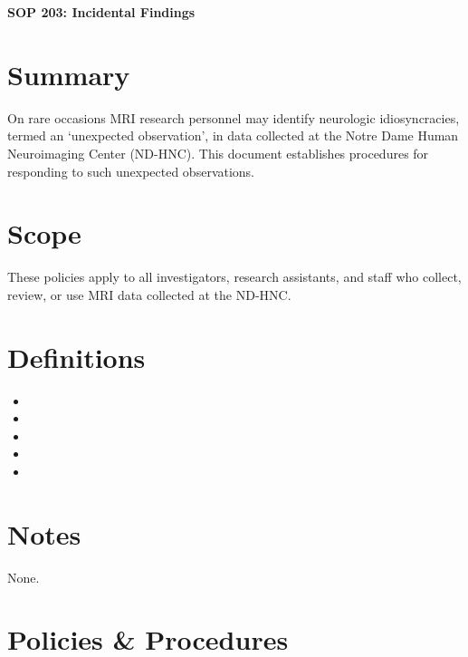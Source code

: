 \documentclass[11pt]{article}
\begin{document}
\renewcommand{\labelenumii}{\arabic{enumi}.\arabic{enumii}}
\renewcommand{\labelenumiii}{\arabic{enumi}.\arabic{enumii}.\arabic{enumiii}}
\renewcommand{\labelenumiv}{\arabic{enumi}.\arabic{enumii}.\arabic{enumiii}.\arabic{enumiv}}

\begin{center}
	\textbf{\Large SOP 203: Incidental Findings}\\
	\hrulefill
\end{center}


\section{Summary}
On rare occasions MRI research personnel may identify neurologic idiosyncracies, termed an `unexpected observation', in data collected at the Notre Dame Human Neuroimaging Center (ND-HNC). This document establishes procedures for responding to such unexpected observations.

\section{Scope}
These policies apply to all investigators, research assistants, and staff who collect, review, or use MRI data collected at the ND-HNC.

\section{Definitions}

\begin{itemize}
    \item \DICOM
    \item \IncidentalFinding
    \item \IRB
    \item \PI
    \item \Operator
\end{itemize}


\section{Notes}

None.


\section{Policies \& Procedures}

\end{document}
